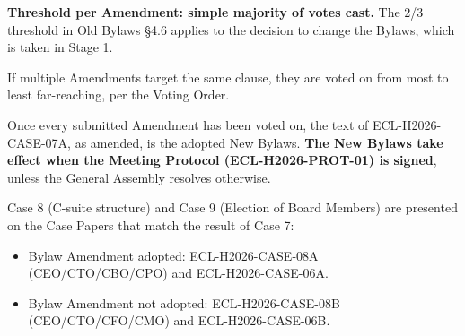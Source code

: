 \documentclass{../../../Common/Latex/Templates/rapport}
\begin{document}
\textbf{Threshold per Amendment: simple majority of votes cast.} The 2/3 threshold in Old Bylaws \S4.6 applies to the decision to change the Bylaws, which is taken in Stage 1.

If multiple Amendments target the same clause, they are voted on from most to least far-reaching, per the Voting Order.

Once every submitted Amendment has been voted on, the text of ECL-H2026-CASE-07A, as amended, is the adopted New Bylaws. \textbf{The New Bylaws take effect when the Meeting Protocol (ECL-H2026-PROT-01) is signed}, unless the General Assembly resolves otherwise.

Case 8 (C-suite structure) and Case 9 (Election of Board Members) are presented on the Case Papers that match the result of Case 7:
\begin{itemize}
  \item Bylaw Amendment adopted: ECL-H2026-CASE-08A (CEO/CTO/CBO/CPO) and ECL-H2026-CASE-06A.
  \item Bylaw Amendment not adopted: ECL-H2026-CASE-08B (CEO/CTO/CFO/CMO) and ECL-H2026-CASE-06B.
\end{itemize}
\end{document}
